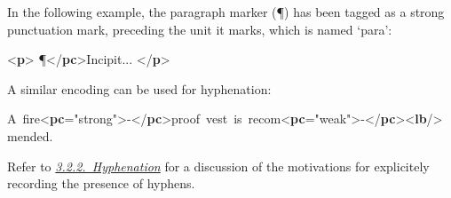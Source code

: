 In the following example, the paragraph marker (¶) has been tagged as a strong punctuation mark, preceding the unit it marks, which is named ‘para’: \par\bgroup{}\exampleFont \begin{shaded}\noindent\mbox{}{<\textbf{p}>}\mbox{}\newline 
{}¶{</\textbf{pc}>}Incipit...\mbox{}\newline 
{</\textbf{p}>}\end{shaded}\egroup\par \par
A similar encoding can be used for hyphenation: \par\bgroup{}\exampleFont \begin{shaded}\noindent\mbox{}A fire{<\textbf{pc}\hspace*{1em}{force}="{strong}">}-{</\textbf{pc}>}proof vest is recom{<\textbf{pc}\hspace*{1em}{force}="{weak}">}-{</\textbf{pc}>}{<\textbf{lb}/>}\newline
mended. \newline
\end{shaded}\egroup\par \noindent  Refer to \textit{\hyperref[COPU-2]{3.2.2.\ Hyphenation}} for a discussion of the motivations for explicitely recording the presence of hyphens.\par
